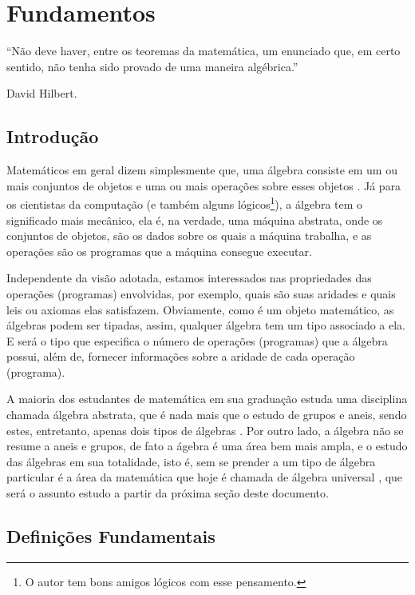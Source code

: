 \chapter{Fundamentos}

\epigraph{``Não deve haver, entre os teoremas da matemática, um enunciado que, em certo sentido, não tenha sido provado de uma maneira algébrica.''}{David Hilbert.}

\section{Introdução}


Matemáticos em geral dizem simplesmente que, uma álgebra consiste em um ou mais conjuntos de objetos e uma ou mais operações sobre esses objetos \cite{lang2008}. Já para os cientistas da computação (e também alguns lógicos\footnote{O autor tem bons amigos lógicos com esse pensamento.}), a álgebra tem o significado mais mecânico, ela é, na verdade, uma máquina abstrata, onde os conjuntos de objetos, são os dados sobre os quais a máquina trabalha, e as operações são os programas que a máquina consegue executar.

Independente da visão adotada, estamos interessados nas propriedades das operações (programas) envolvidas, por exemplo, quais são suas aridades e quais leis ou axiomas elas satisfazem. Obviamente, como é um objeto matemático, as álgebras podem ser tipadas, assim, qualquer álgebra tem um tipo associado a ela. E será o tipo que especifica o número de operações (programas) que a álgebra possui, além de, fornecer informações sobre a aridade de cada operação (programa). 

A maioria dos estudantes de matemática em sua graduação estuda uma disciplina chamada álgebra abstrata, que é nada mais que o estudo de grupos e aneis, sendo estes, entretanto, apenas dois tipos de álgebras \cite{stanley1981}. Por outro lado, a álgebra não se resume a aneis e grupos, de fato a ágebra é uma área bem mais ampla, e o estudo das álgebras em sua totalidade, isto é, sem se prender a um tipo de álgebra particular é a área da matemática que hoje é chamada de álgebra universal \cite{klaus2001, benja-Logica}, que será o assunto estudo a partir da próxima seção deste documento.


\section{Definições Fundamentais}

